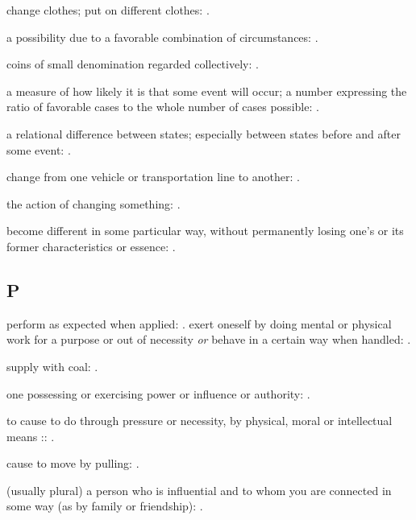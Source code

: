   change clothes; put on different clothes: .

  a possibility due to a favorable combination of circumstances:   .

  coins of small denomination regarded collectively: .

  a measure of how likely it is that some event will occur; a number expressing the ratio of favorable cases to the whole number of cases possible:   .

  a relational difference between states; especially between states before and after some event: .

  change from one vehicle or transportation line to another:   .

  the action of changing something: .

  become different in some particular way, without permanently losing one's or its former characteristics or essence:   .

\subsection*{P}

  perform as expected when applied:   . exert oneself by doing mental or physical work for a purpose or out of necessity \textit{or} behave in a certain way when handled: .

  supply with coal: .

  one possessing or exercising power or influence or authority:   .

  to cause to do through pressure or necessity, by physical, moral or intellectual means ::   .

  cause to move by pulling:   .

  (usually plural) a person who is influential and to whom you are connected in some way (as by family or friendship): .

